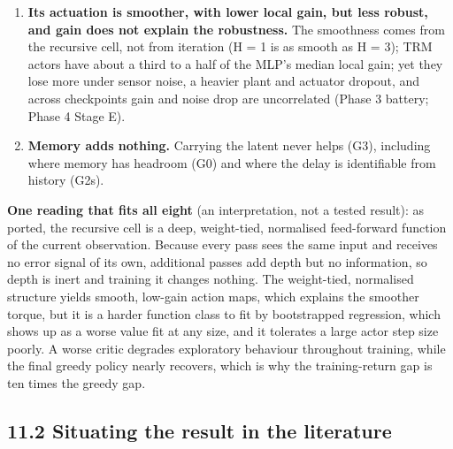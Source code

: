 \documentclass[11pt]{article}
\begin{document}
\begin{enumerate}
\item \textbf{Its actuation is smoother, with lower local gain, but less robust, and gain does not explain the robustness.} The smoothness comes from the recursive cell, not from iteration (H = 1 is as smooth as H = 3); TRM actors have about a third to a half of the MLP's median local gain; yet they lose more under sensor noise, a heavier plant and actuator dropout, and across checkpoints gain and noise drop are uncorrelated (Phase 3 battery; Phase 4 Stage E).
\item \textbf{Memory adds nothing.} Carrying the latent never helps (G3), including where memory has headroom (G0) and where the delay is identifiable from history (G2s).
\end{enumerate}



\textbf{One reading that fits all eight} (an interpretation, not a tested result): as ported, the recursive cell is a deep, weight-tied, normalised feed-forward function of the current observation. Because every pass sees the same input and receives no error signal of its own, additional passes add depth but no information, so depth is inert and training it changes nothing. The weight-tied, normalised structure yields smooth, low-gain action maps, which explains the smoother torque, but it is a harder function class to fit by bootstrapped regression, which shows up as a worse value fit at any size, and it tolerates a large actor step size poorly. A worse critic degrades exploratory behaviour throughout training, while the final greedy policy nearly recovers, which is why the training-return gap is ten times the greedy gap.



\subsection*{11.2 Situating the result in the literature}
\end{document}
